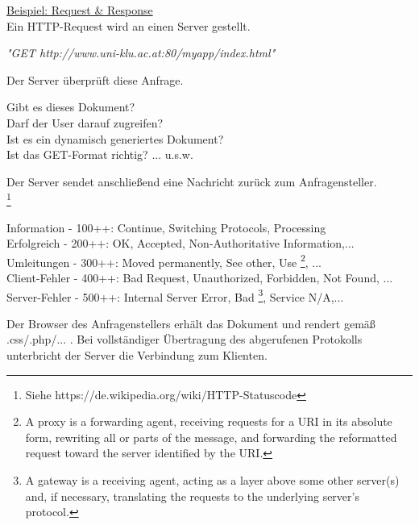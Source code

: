 \documentclass[11pt]{article}
\begin{document}
\begin{enumerate}[\thesection .1]
\begin{enumerate}[$\diamond$]
        \underline{Beispiel: Request \& Response}\\
        Ein HTTP-Request wird an einen Server gestellt.
        \begin{addmargin}[1em]{1em}
            \emph{"GET http://www.uni-klu.ac.at:80/myapp/index.html"}
        \end{addmargin}
        Der Server überprüft diese Anfrage.
        \begin{addmargin}[1em]{1em}
            Gibt es dieses Dokument?\\
            Darf der User darauf zugreifen?\\
            Ist es ein dynamisch generiertes Dokument?\\
            Ist das GET-Format richtig? ... u.s.w.
        \end{addmargin}
        Der Server sendet anschließend eine Nachricht zurück zum Anfragensteller.\\
        \footnote[1 Vgl.: HTTP-Statuscodes]{Siehe https://de.wikipedia.org/wiki/HTTP-Statuscode}
        \begin{addmargin}[1em]{1em}
            Information - 100++: Continue, Switching Protocols, Processing\\
            Erfolgreich - 200++: OK, Accepted, Non-Authoritative Information,...\\
            Umleitungen - 300++: Moved permanently, See other, Use \footnote[2 Proxy]{A proxy is a
            forwarding agent, receiving requests for a URI in its absolute form,
            rewriting all or parts of the message, and forwarding the reformatted
            request toward the server identified by the URI.}, ...\\
            Client-Fehler - 400++: Bad Request, Unauthorized, Forbidden, Not Found, ...\\
            Server-Fehler - 500++: Internal Server Error, Bad \footnote[3 Gateway]{A gateway is a
            receiving agent, acting as a layer above some other server(s) and, if
            necessary, translating the requests to the underlying server's
            protocol.}, Service N/A,...
        \end{addmargin}
        Der Browser des Anfragenstellers erhält das Dokument und rendert gemäß .css/.php/... .
        Bei vollständiger Übertragung des abgerufenen Protokolls unterbricht der Server die Verbindung zum Klienten.\\


\end{enumerate}
\end{enumerate}
\end{document}
